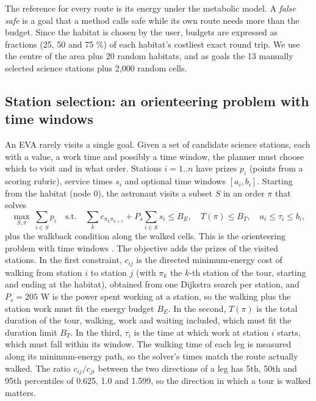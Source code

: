 \documentclass[11pt,a4paper]{article}
\begin{document}
The reference for every route is its energy under the metabolic model. A \emph{false safe} is a goal that a method calls safe while its own route needs more than the budget. Since the habitat is chosen by the user, budgets are expressed as fractions (25, 50 and 75 \%) of each habitat's costliest exact round trip. We use the centre of the area plus 20 random habitats, and as goals the 13 manually selected science stations plus 2,000 random cells.

\subsection{Station selection: an orienteering problem with time windows}

An EVA rarely visits a single goal. Given a set of candidate science stations, each with a value, a work time and possibly a time window, the planner must choose which to visit and in what order. Stations $i = 1..n$ have prizes $p_i$ (points from a scoring rubric), service times $s_i$ and optional time windows $[a_i, b_i]$. Starting from the habitat (node 0), the astronaut visits a subset $S$ in an order $\pi$ that solves \[\max_{S,\pi}\ \sum_{i \in S} p_i \quad \text{s.t.}\quad \sum_{k} c_{\pi_k \pi_{k+1}} + P_s \sum_{i \in S} s_i \le B_E,\quad T(\pi) \le B_T,\quad a_i \le \tau_i \le b_i,\] plus the walkback condition along the walked cells. This is the orienteering problem with time windows \cite{Vansteenwegen2011,Gunawan2016}. The objective adds the prizes of the visited stations. In the first constraint, $c_{ij}$ is the directed minimum-energy cost of walking from station $i$ to station $j$ (with $\pi_k$ the $k$-th station of the tour, starting and ending at the habitat), obtained from one Dijkstra search per station, and $P_s = 205$ W is the power spent working at a station, so the walking plus the station work must fit the energy budget $B_E$. In the second, $T(\pi)$ is the total duration of the tour, walking, work and waiting included, which must fit the duration limit $B_T$. In the third, $\tau_i$ is the time at which work at station $i$ starts, which must fall within its window. The walking time of each leg is measured along its minimum-energy path, so the solver's times match the route actually walked. The ratio $c_{ij}/c_{ji}$ between the two directions of a leg has 5th, 50th and 95th percentiles of 0.625, 1.0 and 1.599, so the direction in which a tour is walked matters.
\end{document}

